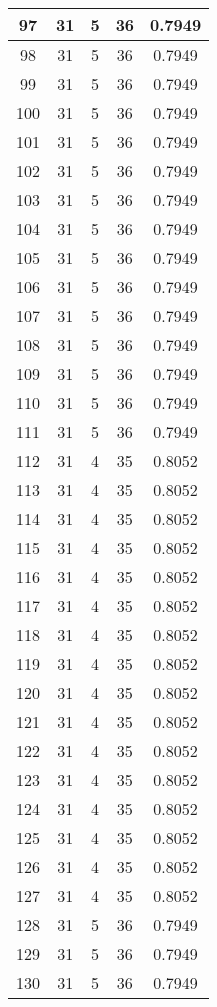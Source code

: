 \documentclass[letterpaper, 12pt]{article}
\begin{document}
\begin{longtable}{|c|c|c|c|c|}
\hline
97 & 31 & 5 & 36 & 0.7949 \\
\hline
98 & 31 & 5 & 36 & 0.7949 \\
\hline
99 & 31 & 5 & 36 & 0.7949 \\
\hline
100 & 31 & 5 & 36 & 0.7949 \\
\hline
101 & 31 & 5 & 36 & 0.7949 \\
\hline
102 & 31 & 5 & 36 & 0.7949 \\
\hline
103 & 31 & 5 & 36 & 0.7949 \\
\hline
104 & 31 & 5 & 36 & 0.7949 \\
\hline
105 & 31 & 5 & 36 & 0.7949 \\
\hline
106 & 31 & 5 & 36 & 0.7949 \\
\hline
107 & 31 & 5 & 36 & 0.7949 \\
\hline
108 & 31 & 5 & 36 & 0.7949 \\
\hline
109 & 31 & 5 & 36 & 0.7949 \\
\hline
110 & 31 & 5 & 36 & 0.7949 \\
\hline
111 & 31 & 5 & 36 & 0.7949 \\
\hline
112 & 31 & 4 & 35 & 0.8052 \\
\hline
113 & 31 & 4 & 35 & 0.8052 \\
\hline
114 & 31 & 4 & 35 & 0.8052 \\
\hline
115 & 31 & 4 & 35 & 0.8052 \\
\hline
116 & 31 & 4 & 35 & 0.8052 \\
\hline
117 & 31 & 4 & 35 & 0.8052 \\
\hline
118 & 31 & 4 & 35 & 0.8052 \\
\hline
119 & 31 & 4 & 35 & 0.8052 \\
\hline
120 & 31 & 4 & 35 & 0.8052 \\
\hline
121 & 31 & 4 & 35 & 0.8052 \\
\hline
122 & 31 & 4 & 35 & 0.8052 \\
\hline
123 & 31 & 4 & 35 & 0.8052 \\
\hline
124 & 31 & 4 & 35 & 0.8052 \\
\hline
125 & 31 & 4 & 35 & 0.8052 \\
\hline
126 & 31 & 4 & 35 & 0.8052 \\
\hline
127 & 31 & 4 & 35 & 0.8052 \\
\hline
128 & 31 & 5 & 36 & 0.7949 \\
\hline
129 & 31 & 5 & 36 & 0.7949 \\
\hline
130 & 31 & 5 & 36 & 0.7949 \\

\end{longtable}
\end{document}
